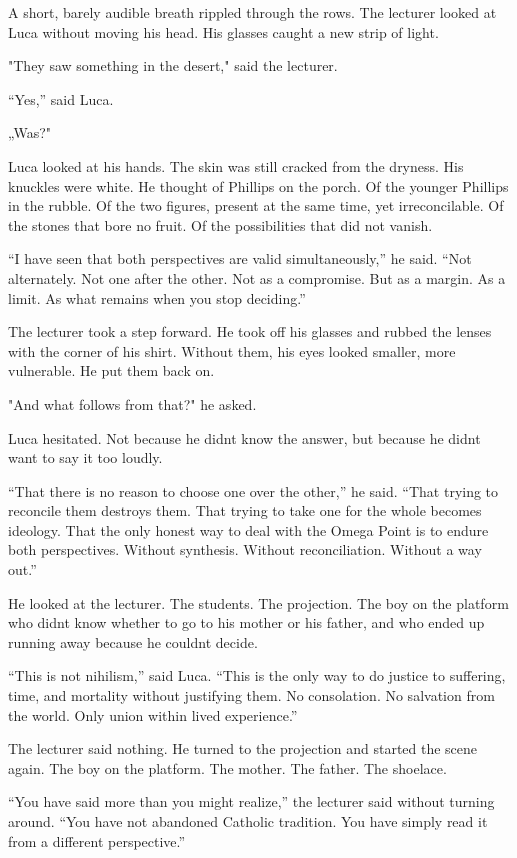 \documentclass[
  ngerman,
]{article}
\begin{document}
A short, barely audible breath rippled through the rows. The lecturer
looked at Luca without moving his head. His glasses caught a new strip
of light.

"They saw something in the desert," said the lecturer.

``Yes,'' said Luca.

„Was?"

Luca looked at his hands. The skin was still cracked from the dryness.
His knuckles were white. He thought of Phillips on the porch. Of the
younger Phillips in the rubble. Of the two figures, present at the same
time, yet irreconcilable. Of the stones that bore no fruit. Of the
possibilities that did not vanish.

``I have seen that both perspectives are valid simultaneously,'' he
said. ``Not alternately. Not one after the other. Not as a compromise.
But as a margin. As a limit. As what remains when you stop deciding.''

The lecturer took a step forward. He took off his glasses and rubbed the
lenses with the corner of his shirt. Without them, his eyes looked
smaller, more vulnerable. He put them back on.

"And what follows from that?" he asked.

Luca hesitated. Not because he didn\textquotesingle t know the answer,
but because he didn\textquotesingle t want to say it too loudly.

``That there is no reason to choose one over the other,'' he said.
``That trying to reconcile them destroys them. That trying to take one
for the whole becomes ideology. That the only honest way to deal with
the Omega Point is to endure both perspectives. Without synthesis.
Without reconciliation. Without a way out.''

He looked at the lecturer. The students. The projection. The boy on the
platform who didn\textquotesingle t know whether to go to his mother or
his father, and who ended up running away because he
couldn\textquotesingle t decide.

``This is not nihilism,'' said Luca. ``This is the only way to do
justice to suffering, time, and mortality without justifying them. No
consolation. No salvation from the world. Only union within lived
experience.''

The lecturer said nothing. He turned to the projection and started the
scene again. The boy on the platform. The mother. The father. The
shoelace.

``You have said more than you might realize,'' the lecturer said without
turning around. ``You have not abandoned Catholic tradition. You have
simply read it from a different perspective.''
\end{document}
